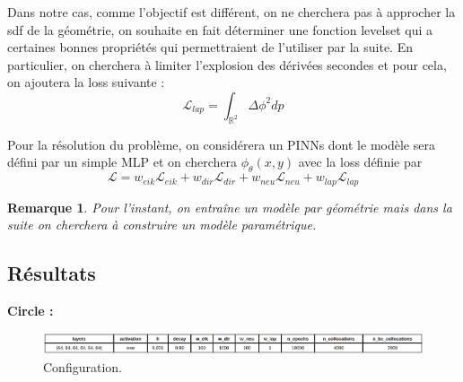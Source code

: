 \documentclass[french]{article}
\newtheorem*{Rem}{Remarque}
\begin{document}
	Dans notre cas, comme l'objectif est différent, on ne cherchera pas à approcher la sdf de la géométrie, on souhaite en fait déterminer une fonction levelset qui a certaines bonnes propriétés qui permettraient de l'utiliser par la suite. En particulier, on cherchera à limiter l'explosion des dérivées secondes et pour cela, on ajoutera la loss suivante : 
	\begin{equation*}
		\mathcal{L}_{lap}=\int_{\mathbb{R}^2} \Delta\phi^2 dp
	\end{equation*}

	Pour la résolution du problème, on considérera un PINNs dont le modèle sera défini par un simple MLP et on cherchera $\phi_\theta(x,y)$ avec la loss définie par
	\begin{equation*}
		\mathcal{L}=w_{eik}\mathcal{L}_{eik}+w_{dir}\mathcal{L}_{dir}+w_{neu}\mathcal{L}_{neu}+w_{lap}\mathcal{L}_{lap}
	\end{equation*}
	
	\begin{Rem}
		Pour l'instant, on entraîne un modèle par géométrie mais dans la suite on cherchera à construire un modèle paramétrique.
	\end{Rem}

	\subsection{Résultats}
	
	\textbf{Circle :}
	
	\begin{figure}[H]
		\centering
		\includegraphics[width=\linewidth]{"levelset/circle/config_circle.png"}
		\caption{Configuration.}
	\end{figure}
	
\end{document}
